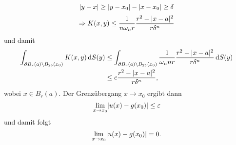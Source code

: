\begin{beweis}
\begin{enumerate}[(i)]
\[				\lvert y-x\rvert \geq  \lvert y-x_0\rvert- \lvert x-x_0\rvert \geq \delta 
			\]
			\[
				\Rightarrow K(x,y) \leq \frac{1}{n \omega_n r} \frac{r^2 - \lvert x-a\rvert^2}{r \delta ^n}
			\]
			und damit 
			\begin{align*}
				\int_{\partial B_r(a) \setminus B_{2 \delta }(x_0)}^{} K(x,y) \,\mathrm{d}S(y) 
				&\leq \int_{\partial B_r(a) \setminus B_{2 \delta }(x_0)}^{} \frac{1}{\omega_n n r }\frac{ r^2 - \lvert x-a\rvert^2}{r \delta^n } \,\mathrm{d}S(y) \\
				&\leq c \frac{r^2 - \lvert x-a\rvert^2}{r \delta^n} ,
			\end{align*}
			wobei $x \in B_r(a)$. Der Grenzübergang $x \to x_0$ ergibt dann
			\[
				\lim_{x \to x_0} \lvert u(x)-g(x_0)\rvert \leq \varepsilon
			\]
			und damit folgt
			\[
				\lim_{x \to x_0} \lvert u(x)- g(x_0)\rvert = 0.
			\]
		\end{enumerate}
	\end{beweis}
